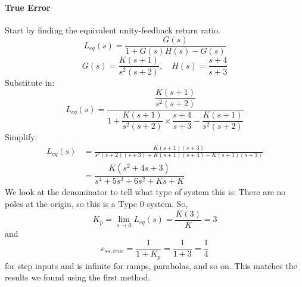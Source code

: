 \documentclass{book}
\begin{document}
\paragraph*{True Error} 
Start by finding the equivalent unity-feedback return ratio. 
\[ L_{eq}(s) = \frac{G(s)}{1 + G(s)H(s) - G(s)} \]
\[ G(s) = \frac{K(s+1)}{s^2(s+2)},\quad H(s) = \frac{s+4}{s+3} \]
Substitute in:
\[ L_{eq}(s) = \frac{\dfrac{K(s+1)}{s^2(s+2)}}{1 + \dfrac{K(s+1)}{s^2(s+2)}\times \dfrac{s+4}{s+3} - \dfrac{K(s+1)}{s^2(s+2)}} \]
Simplify:
\begin{align*}
L_{eq}(s) &= \frac { K(s+1)(s+3) }{ s^2(s+2)(s+3) + K(s+1)(s+4) - K(s+1)(s+3) }\\
&= \dfrac{K(s^2+4s+3)}{s^4+5s^3+6s^2+Ks+K} 
\end{align*}
We look at the denominator to tell what type of system this is: There are no poles at the origin, so this is a Type 0 system. So,
\[ K_p = \lim_{s\to0}L_{eq}(s)=\frac{K(3)}{K} = 3 \]
and
\[ e_{ss,true} = \frac{1}{1+K_p} = \frac{1}{1+3} = \frac{1}{4} \]
for step inputs and is infinite for ramps, parabolas, and so on. This matches the results we found using the first method.
\end{document}
